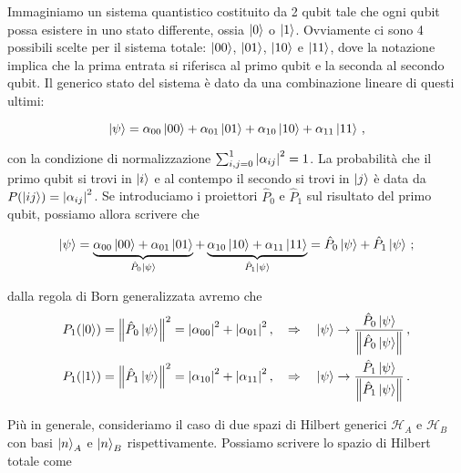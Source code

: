 \begin{esempio}
    Immaginiamo un sistema quantistico costituito da 2 qubit tale che ogni qubit possa esistere in uno stato differente, ossia $\ket{0}$ o $\ket{1}$. Ovviamente ci sono 4 possibili scelte per il sistema totale: $\ket{00}$, $\ket{01}$, $\ket{10}$ e $\ket{11}$, dove la notazione implica che la prima entrata si riferisca al primo qubit e la seconda al secondo qubit. Il generico stato del sistema è dato da una combinazione lineare di questi ultimi:
    
    \begin{equation*}
        \ket{\psi} = \alpha_{00} \ket{00} + \alpha_{01} \ket{01} + \alpha_{10} \ket{10} + \alpha_{11} \ket{11} \, ,
    \end{equation*}
    
    \noindent con la condizione di normalizzazione $\sum_{i,j=0}^1 \abs{\alpha_{ij}}^2 = 1$. La probabilità che il primo qubit si trovi in $\ket{i}$ e al contempo il secondo si trovi in $\ket{j}$ è data da $P(\ket{ij}) = \abs{\alpha_{ij}}^2$. Se introduciamo i proiettori $\hat{P}_0$ e $\hat{P}_1$ sul risultato del primo qubit, possiamo allora scrivere che
    
    \begin{equation*}
        \ket{\psi} = \underbrace{\alpha_{00} \ket{00} + \alpha_{01} \ket{01}}_{\hat{P}_0 \ket{\psi}} + \underbrace{\alpha_{10} \ket{10} + \alpha_{11} \ket{11}}_{\hat{P}_1 \ket{\psi}} = \hat{P}_0 \ket{\psi} + \hat{P}_1 \ket{\psi} \, ;
    \end{equation*}
    
        \noindent dalla regola di Born generalizzata avremo che
        \begin{align*}
            P_1(\ket{0}) &= \norm{\hat{P}_0 \ket{\psi}}^2 = \abs{\alpha_{00}}^2 + \abs{\alpha_{01}}^2 \, , \quad \Rightarrow \quad \ket{\psi} \rightarrow \frac{\hat{P}_0 \ket{\psi}}{\norm{\hat{P}_0 \ket{\psi}}} \, , \\
            P_1(\ket{1}) &= \norm{\hat{P}_1 \ket{\psi}}^2 = \abs{\alpha_{10}}^2 + \abs{\alpha_{11}}^2 \, , \quad \Rightarrow \quad \ket{\psi} \rightarrow \frac{\hat{P}_1 \ket{\psi}}{\norm{\hat{P}_1 \ket{\psi}}} \, .
        \end{align*}
\end{esempio}

\noindent Più in generale, consideriamo il caso di due spazi di Hilbert generici $\mathcal{H}_A$ e $\mathcal{H}_B$ con basi $\ket{n}_A$ e $\ket{n}_B$ rispettivamente. Possiamo scrivere lo spazio di Hilbert totale come 

